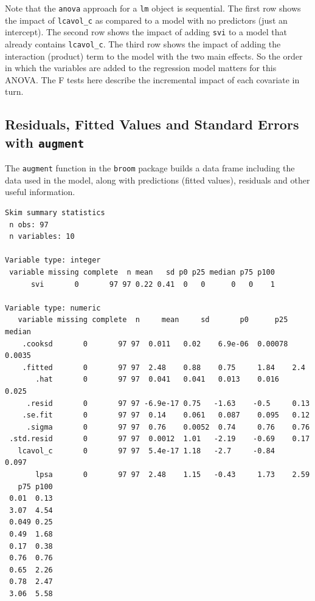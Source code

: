 \documentclass[]{book}
\newenvironment{Shaded}{\begin{snugshade}}{\end{snugshade}}
\newcommand{\KeywordTok}[1]{\textcolor[rgb]{0.13,0.29,0.53}{\textbf{#1}}}
\newcommand{\StringTok}[1]{\textcolor[rgb]{0.31,0.60,0.02}{#1}}
\newcommand{\OperatorTok}[1]{\textcolor[rgb]{0.81,0.36,0.00}{\textbf{#1}}}
\newcommand{\NormalTok}[1]{#1}
\theoremstyle{definition}
\theoremstyle{definition}
\theoremstyle{definition}
\theoremstyle{remark}
\begin{document}
Note that the \texttt{anova} approach for a \texttt{lm} object is
sequential. The first row shows the impact of \texttt{lcavol\_c} as
compared to a model with no predictors (just an intercept). The second
row shows the impact of adding \texttt{svi} to a model that already
contains \texttt{lcavol\_c}. The third row shows the impact of adding
the interaction (product) term to the model with the two main effects.
So the order in which the variables are added to the regression model
matters for this ANOVA. The F tests here describe the incremental impact
of each covariate in turn.

\subsection{\texorpdfstring{Residuals, Fitted Values and Standard Errors
with
\texttt{augment}}{Residuals, Fitted Values and Standard Errors with augment}}\label{residuals-fitted-values-and-standard-errors-with-augment}

The \texttt{augment} function in the \texttt{broom} package builds a
data frame including the data used in the model, along with predictions
(fitted values), residuals and other useful information.

\begin{Shaded}
\end{Shaded}

\begin{verbatim}
Skim summary statistics
 n obs: 97 
 n variables: 10 

Variable type: integer 
 variable missing complete  n mean   sd p0 p25 median p75 p100
      svi       0       97 97 0.22 0.41  0   0      0   0    1

Variable type: numeric 
   variable missing complete  n     mean     sd       p0      p25 median
    .cooksd       0       97 97  0.011   0.02    6.9e-06  0.00078 0.0035
    .fitted       0       97 97  2.48    0.88    0.75     1.84    2.4   
       .hat       0       97 97  0.041   0.041   0.013    0.016   0.025 
     .resid       0       97 97 -6.9e-17 0.75   -1.63    -0.5     0.13  
    .se.fit       0       97 97  0.14    0.061   0.087    0.095   0.12  
     .sigma       0       97 97  0.76    0.0052  0.74     0.76    0.76  
 .std.resid       0       97 97  0.0012  1.01   -2.19    -0.69    0.17  
   lcavol_c       0       97 97  5.4e-17 1.18   -2.7     -0.84    0.097 
       lpsa       0       97 97  2.48    1.15   -0.43     1.73    2.59  
   p75 p100
 0.01  0.13
 3.07  4.54
 0.049 0.25
 0.49  1.68
 0.17  0.38
 0.76  0.76
 0.65  2.26
 0.78  2.47
 3.06  5.58
\end{verbatim}
\end{document}
